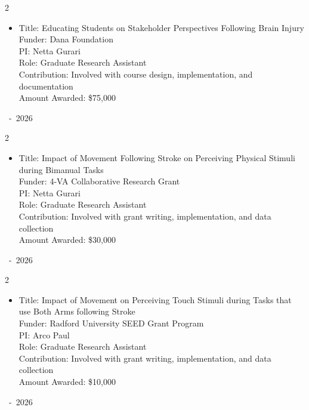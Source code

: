 \documentclass[10pt, letterpaper]{article}
\newenvironment{highlights}{
    \begin{itemize}[
        topsep=0.10 cm,
        parsep=0.10 cm,
        partopsep=0pt,
        itemsep=0pt,
        leftmargin=0.2 cm + 10pt
    ]
}{
    \end{itemize}
} %
\newenvironment{twocolentry}[2][]{
    \onecolentry
    \def\secondColumn{#2}
    \setcolumnwidth{\fill, 2.8 cm}
    \begin{paracol}{2}
}{
    \switchcolumn \raggedleft \secondColumn
    \end{paracol}
    \endonecolentry
} %
\begin{document}
\begin{twocolentry}{
        2024~-~2026
        }
\begin{highlights}

\item Title: Educating Students on Stakeholder Perspectives Following Brain Injury \\
Funder: Dana Foundation\\
PI: Netta Gurari\\
Role: Graduate Research Assistant\\
Contribution: Involved with course design, implementation, and documentation\\
Amount Awarded: \$75,000 \\
\end{highlights}
\end{twocolentry}
\vspace{-.8em}




\begin{twocolentry}{
        2025~-~2026
        }
\begin{highlights}

\item Title: Impact of Movement Following Stroke on Perceiving Physical Stimuli during Bimanual Tasks\\
Funder: 4-VA Collaborative Research Grant\\
PI: Netta Gurari\\
Role: Graduate Research Assistant\\
Contribution: Involved with grant writing, implementation, and data collection\\
Amount Awarded: \$30,000 \\
\end{highlights}
\end{twocolentry}
\vspace{-.8em}

\begin{twocolentry}{
        2025~-~2026
        }
\begin{highlights}

\item Title: Impact of Movement on Perceiving Touch Stimuli during Tasks that use Both Arms following Stroke\\
Funder: Radford University SEED Grant Program\\
PI: Arco Paul\\
Role: Graduate Research Assistant \\
Contribution: Involved with grant writing, implementation, and data collection\\
Amount Awarded: \$10,000 \\
\end{highlights}
\end{twocolentry}
\end{document}
